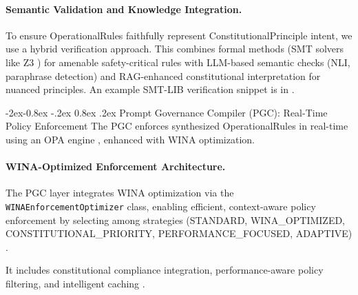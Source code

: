 \documentclass[manuscript,screen,9pt]{acmart}
\makeatletter
\renewcommand\subsubsection{\@startsection{subsubsection}{3}{\z@}%
  {-2ex\@plus -0.8ex \@minus -.2ex}%
  {0.8ex \@plus .2ex}%
  {\normalfont\normalsize\bfseries}}
\makeatother
\begin{document}
\paragraph{Semantic Validation and Knowledge Integration.}
\label{subsubsec:semantic_validation}
To ensure OperationalRules faithfully represent ConstitutionalPrinciple intent, we use a hybrid verification approach. This combines formal methods (SMT solvers like Z3 \cite{Barrett2018SMTSolving, DeMouraZ3}) for amenable safety-critical rules with LLM-based semantic checks (NLI, paraphrase detection) and RAG-enhanced constitutional interpretation for nuanced principles. An example SMT-LIB verification snippet is in .

\subsubsection{Prompt Governance Compiler (PGC): Real-Time Policy Enforcement}
\label{subsubsec:pgc_layer}
The PGC enforces synthesized OperationalRules in real-time using an OPA engine \cite{Sandall2021OPAReference}, enhanced with WINA optimization.

\paragraph{WINA-Optimized Enforcement Architecture.} The PGC layer integrates WINA optimization via the \texttt{WINA\allowbreak Enforcement\allowbreak Optimizer} class, enabling efficient, context-aware policy enforcement by selecting among strategies (STANDARD, WINA\_OPTIMIZED, CONSTITUTIONAL\_PRIORITY, PERFORMANCE\_FOCUSED, ADAPTIVE) \cite{PolicyEnforcementOptimization2024}.

It includes constitutional compliance integration, performance-aware policy filtering, and intelligent caching \cite{ConstitutionalCompliance2024, IntelligentCaching2024}.
\end{document}
